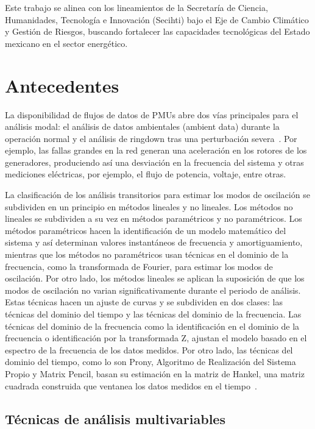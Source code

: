 Este trabajo se alinea con los lineamientos de la Secretaría de Ciencia, Humanidades, Tecnología e Innovación (Secihti) bajo el Eje de Cambio Climático y Gestión de Riesgos, buscando fortalecer las capacidades tecnológicas del Estado mexicano en el sector energético. 
\section{Antecedentes}

La disponibilidad de flujos de datos de PMUs abre dos vías principales para el análisis modal: el análisis de datos ambientales (ambient data) durante la operación normal y el análisis de ringdown tras una perturbación severa~\cite{Thambirajah2010}. Por ejemplo, las fallas grandes en la red generan una aceleración en los rotores de los generadores, produciendo así una desviación en la frecuencia del sistema y otras mediciones eléctricas, por ejemplo, el flujo de potencia, voltaje, entre otras.

La clasificación de los análisis transitorios para estimar los modos de oscilación se subdividen en un principio en métodos lineales y no lineales. Los métodos no lineales se subdividen a su vez en métodos paramétricos y no paramétricos. Los métodos paramétricos hacen la identificación de un modelo matemático del sistema y así determinan valores instantáneos de frecuencia y amortiguamiento, mientras que los métodos no paramétricos usan técnicas en el dominio de la frecuencia, como la transformada de Fourier, para estimar los modos de oscilación. Por otro lado, los métodos lineales se aplican la suposición de que los modos de oscilación no varian significativamente durante el periodo de análisis. Estas técnicas hacen un ajuste de curvas y se subdividen en dos clases: las técnicas del dominio del tiempo y las técnicas del dominio de la frecuencia. Las técnicas del dominio de la frecuencia como la identificación en el dominio de la frecuencia o identificación por la transformada Z, ajustan el modelo basado en el espectro de la frecuencia de los datos medidos. Por otro lado, las técnicas del dominio del tiempo, como lo son Prony, Algoritmo de Realización del Sistema Propio y Matrix Pencil, basan su estimación en la matriz de Hankel, una matriz cuadrada construida que ventanea los datos medidos en el tiempo~\cite{Thambirajah2010}.

\subsection{Técnicas de análisis multivariables}

